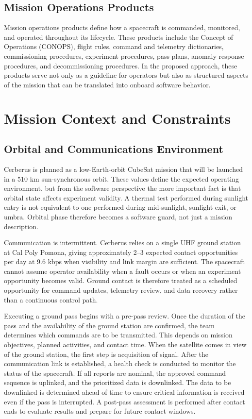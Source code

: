\documentclass[10pt,letterpaper,twoside,fleqn]{article}
\newcommand{\Indent}{\hspace*{4\fontdimen2\font}}
\begin{document}
\subsection{Mission Operations Products}
\Indent
Mission operations products define how a spacecraft is commanded, monitored, and operated throughout its lifecycle. These products include the Concept of Operations (CONOPS), flight rules, command and telemetry dictionaries, commissioning procedures, experiment procedures, pass plans, anomaly response procedures, and decommissioning procedures. In the proposed approach, these products serve not only as a guideline for operators but also as structured aspects of the mission that can be translated into onboard software behavior.

\section{Mission Context and Constraints}

\subsection{Orbital and Communications Environment}

\Indent
Cerberus is planned as a low-Earth-orbit CubeSat mission that will be launched in a 510 km sun-synchronous orbit. These values define the expected operating environment, but from the software perspective the more important fact is that orbital state affects experiment validity. A thermal test performed during sunlight entry is not equivalent to one performed during mid-sunlight, sunlight exit, or umbra. Orbital phase therefore becomes a software guard, not just a mission description.

Communication is intermittent. Cerberus relies on a single UHF ground station at Cal Poly Pomona, giving approximately 2--3 expected contact opportunities per day at 9.6 kbps when visibility and link margin are sufficient. The spacecraft cannot assume operator availability when a fault occurs or when an experiment opportunity becomes valid. Ground contact is therefore treated as a scheduled opportunity for command updates, telemetry review, and data recovery rather than a continuous control path.

Executing a ground pass begins with a pre-pass review. Once the duration of the pass and the availability of the ground station are confirmed, the team determines which commands are to be transmitted. This depends on mission objectives, planned activities, and contact time. When the satellite comes in view of the ground station, the first step is acquisition of signal. After the communication link is established, a health check is conducted to monitor the status of the spacecraft. If all reports are nominal, the approved command sequence is uplinked, and the prioritized data is downlinked. The data to be downlinked is determined ahead of time to ensure critical information is received even if the pass is interrupted. A post-pass assessment is performed after contact ends to evaluate results and prepare for future contact windows.
\end{document}
